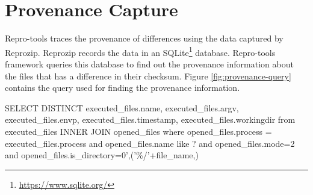 

\section{Provenance Capture}\label{provenance}
Repro-tools traces the provenance of differences using the data captured by Reprozip. Reprozip records the data in an SQLite\footnote{\url{https://www.sqlite.org/}} database. Repro-tools framework queries this database to find out the provenance information about the files that has a difference in their checksum. Figure \ref{fig:provenance-query} contains the query used for finding the provenance information.\\

\begin{tcolorbox}[colback=black!5!white,colframe=black!75!black]
SELECT DISTINCT executed\_files.name, executed\_files.argv, executed\_files.envp, executed\_files.timestamp, executed\_files.workingdir from executed\_files INNER JOIN opened\_files where opened\_files.process = executed\_files.process and opened\_files.name like ? and opened\_files.mode=2 and opened\_files.is\_directory=0',('\%/'+file\_name,)
\end{tcolorbox}
\label{fig:provenance-query}

